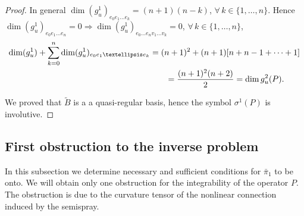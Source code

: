 \documentclass[11pt]{article}
\begin{document}
\begin{proof}
In general $\dim (g_{u}^{1})_{e_{0} e_{1} \dots e_{k}}=(n+1)(n-k)$, $\forall\, k\in \{1,\dots,n\}$.
Hence $\dim (g_{u}^{1})_{e_{0} e_{1} \dots e_{n}}=0\Rightarrow\dim (g_{u}^{1})_{e_{0} \dots e_{n} v_{1} \dots v_{k}}=0$, $\forall\, k\in \{1,\dots,n\}$,
\begin{gather*}
\dim (g_{u}^{1})+\sum_{k=0}^{n}\dim (g_{u}^{1})_{e_{0} e_{1} \dots e_{k}}
   =   (n+1)^{2}+(n+1)[n+n-1+\cdots+1]\\
\hphantom{\dim (g_{u}^{1})+\sum_{k=0}^{n}\dim (g_{u}^{1})_{e_{0} e_{1} \dots e_{k}}}{}   =   \frac{(n+1)^{2}(n+2)}{2}=\dim g_{u}^{2}(P).
   \end{gather*}


We proved that $\tilde{B}$ is a a quasi-regular basis, hence the
symbol $\sigma^{1}(P)$ is involutive.
\end{proof}




\subsection{First obstruction to the inverse problem}

In this subsection we determine necessary and suf\/f\/icient conditions
for $\bar{\pi}_{1}$ to be onto. We will obtain only one obstruction
for the integrability of the operator $P$. The obstruction is due
to the curvature tensor of the nonlinear connection induced by the
semispray.
\end{document}
